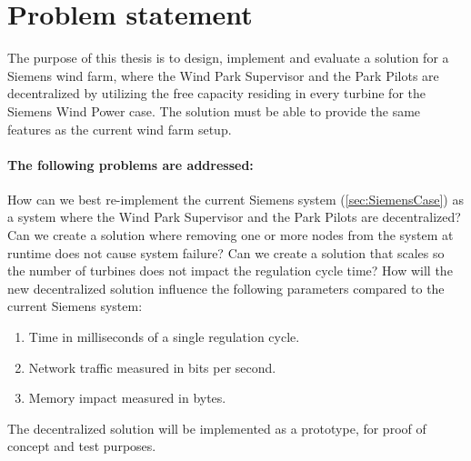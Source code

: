 \section{Problem statement}
\label{sec:problemStatement}

The purpose of this thesis is to design, implement and evaluate a solution for a Siemens wind farm, where the Wind Park Supervisor and the Park Pilots are decentralized by utilizing the free capacity residing in every turbine for the Siemens Wind Power case. The solution must be able to provide the same features as the current wind farm setup. 

\paragraph{The following problems are addressed:}
\begin{description} %
	 How can we best re-implement the current Siemens system (\cref{sec:SiemensCase}) as a system where the Wind Park Supervisor and the Park Pilots are decentralized?
	 Can we create a solution where removing one or more nodes from the system at runtime does not cause system failure?
	 Can we create a solution that scales so the number of turbines does not impact the regulation cycle time?
	 How will the new decentralized solution influence the following parameters compared to the current Siemens system:
	\begin{enumerate}
		\item Time in milliseconds of a single regulation cycle.
		\item Network traffic measured in bits per second.
		\item Memory impact measured in bytes.
	\end{enumerate}
\end{description}

The decentralized solution will be implemented as a prototype, for proof of concept and test purposes.

